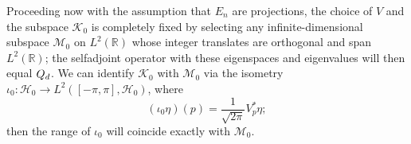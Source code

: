 Proceeding now with the assumption that $E_n$ are projections, the choice of $V$ and the subspace $\mathcal K_0$ is completely fixed by selecting any infinite-dimensional subspace $\mathcal M_0$ on $L^2(\mathbb R)$ whose integer translates are orthogonal and span $L^2(\mathbb R)$; the selfadjoint operator with these eigenspaces and eigenvalues will then equal $Q_d$. We can identify $\mathcal K_0$ with $\mathcal M_0$ via the isometry $\iota_0:\mathcal H_0\to L^2([-\pi,\pi], \mathcal H_0)$, where
$$
(\iota_0\eta)(p) = \frac{1}{\sqrt {2\pi}}V_p^*\eta;
$$
then the range of $\iota_0$ will coincide exactly with $\mathcal M_0$.

